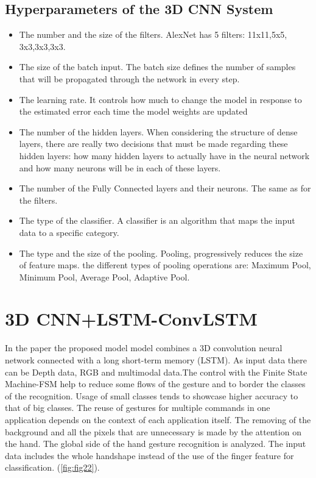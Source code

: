 \documentclass[12pt]{book}
\begin{document}
\section{Hyperparameters of the 3D CNN System}
\begin{itemize}
    \item The number and the size of the filters. AlexNet has 5 filters: 11x11,5x5, 3x3,3x3,3x3. 

\item The size of the batch input. The batch size defines the number of samples that will be propagated through the network in every step. 

\item The learning rate. It controls how much to change the model in response to the estimated error each time the model weights are updated 

\item The number of the hidden layers. When considering the structure of dense layers, there are really two decisions that must be made regarding these hidden layers: how many hidden layers to actually have in the neural network and how many neurons will be in each of these layers. 

\item The number of the Fully Connected layers and their neurons. The same as for the filters. 

\item The type of the classifier. A classifier is an algorithm that maps the input data to a specific category. 

\item The type and the size of the pooling. Pooling, progressively reduces the size of feature maps. the different types of pooling operations are: Maximum Pool, Minimum Pool, Average Pool, Adaptive Pool. 
\end{itemize}

\chapter{3D CNN+LSTM-ConvLSTM}
 In the paper \cite{NOO2019} the proposed model model combines a 3D convolution neural network connected with a long short-term memory (LSTM). As input data there can be Depth data, RGB and multimodal data.The control with the Finite State Machine-FSM help to reduce some flows of the gesture and to border the classes of the recognition. Usage of small classes tends to showcase higher accuracy to that of big classes. The reuse of gestures for multiple commands in one application depends on the context of each application itself. The removing of the background and all the pixels that are unnecessary  is made by the attention on the hand. The global side of the hand gesture recognition is analyzed. The input data includes the whole handshape instead of the use of the finger feature for classification. (\ref{fig:fig22}). 
\end{document}
